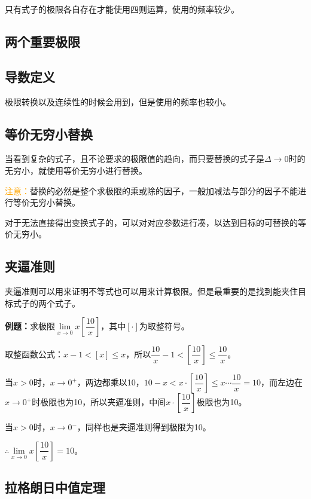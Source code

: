 \documentclass[UTF8, 12pt]{ctexart}
\begin{document}
只有式子的极限各自存在才能使用四则运算，使用的频率较少。

\subsection{两个重要极限}

\subsection{导数定义}

极限转换以及连续性的时候会用到，但是使用的频率也较小。

\subsection{等价无穷小替换}

当看到复杂的式子，且不论要求的极限值的趋向，而只要替换的式子是$\Delta\to 0$时的无穷小，就使用等价无穷小进行替换。

\textcolor{orange}{注意：}替换的必然是整个求极限的乘或除的因子，一般加减法与部分的因子不能进行等价无穷小替换。

对于无法直接得出变换式子的，可以对对应参数进行凑，以达到目标的可替换的等价无穷小。

\subsection{夹逼准则}

夹逼准则可以用来证明不等式也可以用来计算极限。但是最重要的是找到能夹住目标式子的两个式子。\medskip

\textbf{例题：}求极限$\lim\limits_{x\to 0}x\left[\dfrac{10}{x}\right]$，其中$[\cdot]$为取整符号。

取整函数公式：$x-1<[x]\leqslant x$，所以$\dfrac{10}{x}-1<\left[\dfrac{10}{x}\right]\leqslant\dfrac{10}{x}$。

当$x>0$时，$x\to 0^+$，两边都乘以10，$10-x<x\cdot\left[\dfrac{10}{x}\right]\leqslant x\cdots\dfrac{10}{x}=10$，而左边在$x\to 0^+$时极限也为10，所以夹逼准则，中间$x\cdot\left[\dfrac{10}{x}\right]$极限也为10。\medskip

当$x>0$时，$x\to 0^-$，同样也是夹逼准则得到极限为10。\medskip

$\therefore \lim\limits_{x\to 0}x\left[\dfrac{10}{x}\right]=10$。

\subsection{拉格朗日中值定理}
\end{document}
